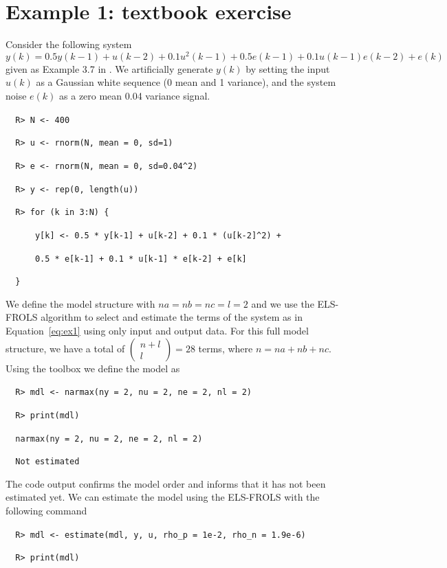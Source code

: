 \documentclass[preprint,12pt, a4paper]{elsarticle}
\begin{document}
\section{Example 1: textbook exercise}

Consider the following system 
\begin{equation} \label{eq:ex1}
y(k) = 0.5 y(k-1) + u(k-2) + 0.1u^2(k-1)+0.5e(k-1)+0.1u(k-1)e(k-2)+e(k)
\end{equation}
given as Example 3.7 in \cite{Billings2013}. We artificially generate $ y(k) $ by setting the input $ u(k) $ as a Gaussian white sequence (0 mean and 1 variance), and the system noise $e(k)$ as a zero mean 0.04 variance signal.

\verb|	R> N <- 400|

\verb|	R> u <- rnorm(N, mean = 0, sd=1)|

\verb|	R> e <- rnorm(N, mean = 0, sd=0.04^2)|

\verb|	R> y <- rep(0, length(u))|

\verb|	R> for (k in 3:N) {|

\verb|		y[k] <- 0.5 * y[k-1] + u[k-2] + 0.1 * (u[k-2]^2) +|

\verb|		0.5 * e[k-1] + 0.1 * u[k-1] * e[k-2] + e[k]|

\verb|	}|

We define the model structure with $ na=nb=nc = l =2 $ and we use the ELS-FROLS algorithm to select and estimate the terms of the system as in Equation~\ref{eq:ex1} using only input and output data. For this full model structure, we have a total of $\begin{pmatrix} n+l \\ l \end{pmatrix} = 28$ terms, where $ n=na+nb+nc $. Using the toolbox we define the model as

\verb|	R> mdl <- narmax(ny = 2, nu = 2, ne = 2, nl = 2)|

\verb|	R> print(mdl)|

\verb|	narmax(ny = 2, nu = 2, ne = 2, nl = 2)|

\verb||		

\verb|	Not estimated|

The code output confirms the model order and informs that it has not been estimated yet. We can estimate the model using the ELS-FROLS with the following command

\verb|	R> mdl <- estimate(mdl, y, u, rho_p = 1e-2, rho_n = 1.9e-6)|

\verb|	R> print(mdl)|
\end{document}
